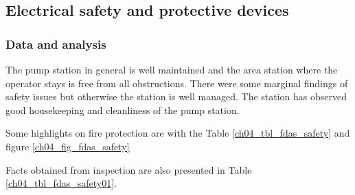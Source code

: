 \subsection{Electrical safety and protective devices} \label{ch04fdas04}
\subsubsection{Data and analysis}
The pump station in general is well maintained and the area station where the operator stays is free from all obstructions. There were some marginal findings of safety issues but otherwise the station is well managed. The station has observed good housekeeping and cleanliness of the pump station.

Some highlights on fire protection are with the Table \ref{ch04_tbl_fdas_safety} and figure \ref{ch04_fig_fdas_safety}





Facts obtained from inspection are also presented in Table \ref{ch04_tbl_fdas_safety01}.








